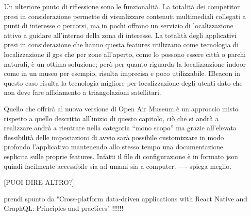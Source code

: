 Un ulteriore punto di riflessione sono le funzionalità. La totalità dei competitor presi in considerazione permette di visualizzare contenuti multimediali collegati a punti di interesse o percorsi, ma in pochi offrono un servizio di localizzazione attivo a guidare all’interno della zona di interesse. La totalità degli applicativi presi in considerazione che hanno questa features utilizzano come tecnologia di localizzazione il gps che per zone all’aperto, come lo possono essere città o parchi naturali, è un ottima soluzione; però per quanto riguarda la localizzazione indoor come in un museo per esempio, risulta imprecisa e poco utilizzabile. IBeacon in questo caso risulta la tecnologia migliore per localizzazione degli utenti dato che non deve fare affidamento a triangolazioni satellitari.\vspace{5mm}

Quello che offrirà al nuova versione di Open Air Museum è un approccio misto rispetto a quello descritto all’inizio di questo capitolo, ciò che si andrà a realizzare andrà a rientrare nella categoria “mono scopo” ma grazie all’elevata flessibilità delle impostazioni di avvio sarà possibile customizzare in modo profondo l’applicativo mantenendo allo stesso tempo una documentazione esplicita sulle proprie features. Infatti il file di configurazione è in formato json quindi facilmente accessibile sia ad umani sia a computer. ---- spiega meglio.\vspace{5mm}


[PUOI DIRE ALTRO?] \vspace{5mm}

prendi spunto da "Cross-platform data-driven applications with React Native and GraphQL: Principles and practices" !!!!!!

